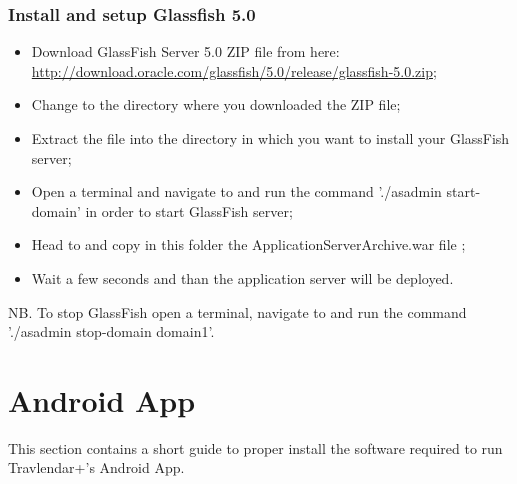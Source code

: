 \subsubsection{Install and setup Glassfish 5.0}
\begin{itemize}
	\item Download GlassFish Server 5.0 ZIP file from here: \\ \href{http://download.oracle.com/glassfish/5.0/release/glassfish-5.0.zip}{\color{blue}http://download.oracle.com/glassfish/5.0/release/glassfish-5.0.zip};
	\item Change to the directory where you downloaded the ZIP file;
	\item Extract the file into the directory in which you want to install your GlassFish server;
	\item Open a terminal and navigate to  and run the command './asadmin start-domain' in order to start GlassFish server;
	\item Head to  and copy in this folder the ApplicationServerArchive.war file ;
	\item Wait a few seconds and than the application server will be deployed.
\end{itemize}
NB. To stop GlassFish open a terminal, navigate to  and run the command './asadmin stop-domain domain1'.

\section{Android App}
\label{sect:Android App}
This section contains a short guide to proper install the software required to run Travlendar+'s Android App.

